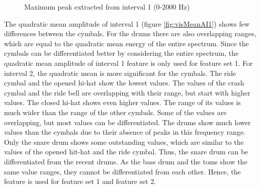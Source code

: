 \begin{figure}[tp]
	\centering
	\caption{Maximum peak extracted from interval 1 (0-2000 Hz)}
	\label{fig:visIntervalFeatures1}
\end{figure}

The quadratic mean amplitude of interval 1 (figure \ref{fig:visMeanAI1}) shows few differences between the cymbals. For the drums there are also overlapping ranges, which are equal to the quadratic mean energy of the entire spectrum. Since the cymbals can be differentiated better by considering the entire spectrum, the quadratic mean amplitude of interval 1 feature is only used for feature set 1. For interval 2, the quadratic mean is more significant for the cymbals. The ride cymbal and the opened hi-hat show the lowest values. The values of the crash cymbal and the ride bell are overlapping with their range, but start with higher values. The closed hi-hat shows even higher values. The range of its values is much wider than the range of the other cymbals. Some of the values are overlapping, but most values can be differentiated. The drums show much lower values than the cymbals due to their absence of peaks in this frequency range. Only the snare drum shows some outstanding values, which are similar to the values of the opened hit-hat and the ride cymbal. Thus, the snare drum can be differentiated from the recent drums. As the bass drum and the toms show the same value ranges, they cannot be differentiated from each other. Hence, the feature is used for feature set 1 and feature set 2.

